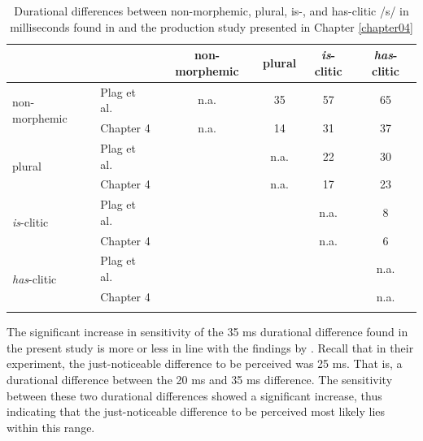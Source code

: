 \begin{table}\fontsize{10}{11}
\caption{Durational differences between non-morphemic, plural, \mbox{is-,} and has-clitic /s/ in milliseconds found in \citet{Plag2017} and the production study presented in Chapter \ref{chapter04}}
\label{tab:6.13}
\centering
\begin{tabular}{llcccc} 
\lsptoprule
\textbf{~}                           & ~           & non-morphemic & plural & \textit{is}-clitic & \textit{has}-clitic  \\ 
\midrule
\multirow{2}{*}{non-morphemic}       & Plag et al. & n.a.          & 35     & 57                 & 65                   \\
                                     & Chapter 4   & n.a.          & 14     & 31                 & 37                   \\ 
\midrule
\multirow{2}{*}{plural}              & Plag et al. & ~             & n.a.   & 22                 & 30                   \\
                                     & Chapter 4   & ~             & n.a.   & 17                 & 23                   \\ 
\midrule
\multirow{2}{*}{\textit{is}-clitic}  & Plag et al. & ~             & ~      & n.a.               & 8                    \\
                                     & Chapter 4   & ~             & ~      & n.a.               & 6                    \\ 
\midrule
\multirow{2}{*}{\textit{has}-clitic} & Plag et al. & ~             & ~      & ~                  & n.a.                 \\
                                     & Chapter 4   & ~             & ~      & ~                  & n.a.                 \\
\lspbottomrule
\end{tabular}
\end{table}

The significant increase in sensitivity of the 35 ms durational difference found in the present study is more or less in line with the findings by \citet{Klatt1975}. Recall that in their experiment, the just-noticeable difference to be perceived was 25 ms. That is, a durational difference between the 20 ms and 35 ms difference. The sensitivity between these two durational differences showed a significant increase, thus indicating that the just-noticeable difference to be perceived most likely lies within this range.

